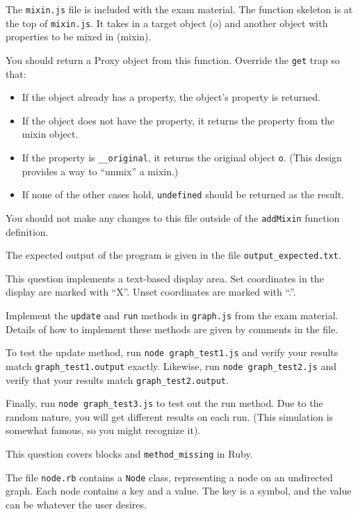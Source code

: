 \documentclass[addpoints]{exam}
\begin{document}
\begin{questions}
The {\tt mixin.js} file is included with the exam material.
The function skeleton is at the top of {\tt mixin.js}.
It takes in a target object (o) and another object with properties to be mixed in (mixin).

You should return a Proxy object from this function.  Override the {\tt get} trap so that:
\begin{itemize}
  \item If the object already has a property, the object's property is returned.
  \item If the object does not have the property, it returns the property from the mixin object.
  \item If the property is {\tt \_\_original}, it returns the original object {\tt o}.
    (This design provides a way to ``unmix'' a mixin.)
  \item If none of the other cases hold, {\tt undefined} should be returned as the result.
\end{itemize}


You should not make any changes to this file outside of the {\tt addMixin} function definition.

The expected output of the program is given in the file {\tt output\_expected.txt}.

\vskip 1in

\question[15]
This question implements a text-based display area.
Set coordinates in the display are marked with ``X''.
Unset coordinates are marked with ``.''.

Implement the {\tt update} and {\tt run} methods in {\tt graph.js} from the exam material.
Details of how to implement these methods are given by comments in the file.

To test the update method, run {\tt node graph\_test1.js} and verify your results match {\tt graph\_test1.output} exactly.
Likewise, run {\tt node graph\_test2.js} and verify that your results match {\tt graph\_test2.output}.

Finally, run {\tt node graph\_test3.js} to test out the run method.
Due to the random nature, you will get different results on each run.
(This simulation is somewhat famous, so you might recognize it).

\vskip 1in

\question[15]
This question covers blocks and {\tt method\_missing} in Ruby.

The file {\tt node.rb} contains a {\tt Node} class, representing a node on an undirected graph.
Each node contains a key and a value.  The key is a symbol, and the value can be whatever the user desires.


\end{questions}
\end{document}
